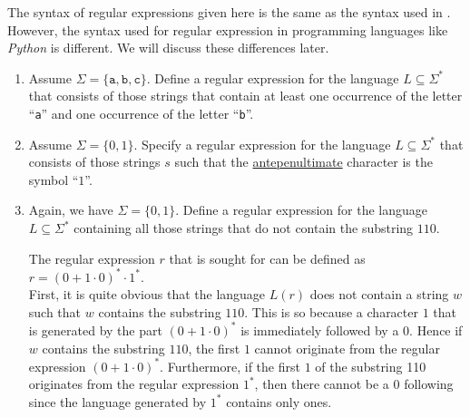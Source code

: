 \remarkEng 
The syntax of regular expressions given here is the same as the syntax used in  \cite{hopcroft:06}.   However,
the syntax used for regular expression in programming languages 
like \textsl{Python} is different.  We will discuss these differences later.

\exerciseEng
\renewcommand{\labelenumi}{(\alph{enumi})}
\begin{enumerate}
\item Assume $\Sigma = \{ \mathtt{a}, \mathtt{b}, \mathtt{c} \}$.  Define a regular expression for the language
      $L \subseteq \Sigma^*$ that consists of those strings that contain at least one occurrence of
      the letter ``\texttt{a}'' and one occurrence of the letter ``\texttt{b}''.
\item Assume $\Sigma = \{ 0, 1 \}$.   Specify a regular expression for the language 
      $L \subseteq \Sigma^*$ that consists of those strings $s$ such that the
      \href{https://dictionary.cambridge.org/dictionary/english/antepenultimate}{antepenultimate} 
      character is the symbol  ``$1$''.
\item Again, we have $\Sigma = \{ 0, 1 \}$.   Define a regular expression for the language
      $L \subseteq \Sigma^*$ containing all those strings that do not contain the substring  $110$.

      \solutionEng
      The regular expression $r$ that is sought for can be defined as 
      \\[0.2cm]
      \hspace*{1.3cm}
      $r = (0 + 1 \cdot 0)^* \cdot 1^*$.
      \\[0.2cm]
      First, it is quite obvious that the language $L(r)$ does not contain a string $w$ such that
      $w$ contains the substring $110$.  This is so because a character $1$ that is generated by the
      part $(0 + 1 \cdot 0)^*$ is immediately followed by a $0$.  Hence if $w$ contains the
      substring $110$, the first $1$ cannot originate from the regular expression $(0 + 1 \cdot 0)^*$.
      Furthermore, if the first $1$ of the substring 110 originates from the regular expression
      $1^*$, then there cannot be a $0$ following since the language generated by $1^*$ contains
      only ones.


\end{enumerate}
